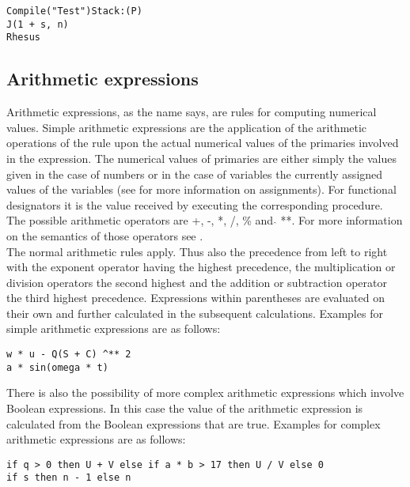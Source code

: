 \documentclass{article}
\begin{document}
\begin{lstlisting}[language={[60]algol}]
Compile("Test")Stack:(P)
J(1 + s, n)
Rhesus
\end{lstlisting}

\subsection{Arithmetic expressions} \label{arithexp}
Arithmetic expressions, as the name says, are rules for computing numerical values. Simple arithmetic expressions are the application of the arithmetic operations of the rule upon the actual numerical values of the primaries involved in the expression. The numerical values of primaries are either simply the values given in the case of numbers or in the case of variables the currently assigned values of the variables (see  for more information on assignments). For functional designators it is the value received by executing the corresponding procedure.\\
The possible arithmetic operators are +, -, *, /, \% and $\hat{}$ **. For more information on the semantics of those operators see .\\
 The normal arithmetic rules apply. Thus also the precedence from left to right with the exponent operator having the highest precedence, the multiplication or division operators the second highest and the addition or subtraction operator the third highest precedence. Expressions within parentheses are evaluated on their own and further calculated in the subsequent calculations. Examples for simple arithmetic expressions are as follows:\\

\begin{lstlisting}[language={[60]algol}]
w * u - Q(S + C) ^** 2
a * sin(omega * t)
\end{lstlisting}

There is also the possibility of more complex arithmetic expressions which involve Boolean expressions. In this case the value of the arithmetic expression is calculated from the Boolean expressions that are true. Examples for complex arithmetic expressions are as follows:\\

\begin{lstlisting}[language={[60]algol}]
if q > 0 then U + V else if a * b > 17 then U / V else 0
if s then n - 1 else n
\end{lstlisting}
\end{document}
